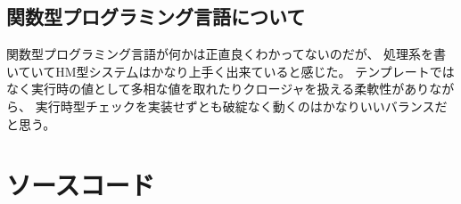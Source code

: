 \documentclass[report]{jlreq}
\begin{document}
    \section{関数型プログラミング言語について}
      関数型プログラミング言語が何かは正直良くわかってないのだが、
      処理系を書いていてHM型システ厶はかなり上手く出来ていると感じた。
      テンプレートではなく実行時の値として多相な値を取れたりクロージャを扱える柔軟性がありながら、
      実行時型チェックを実装せずとも破綻なく動くのはかなりいいバランスだと思う。
  \chapter{ソースコード}
    
    
  
  
\end{document}

